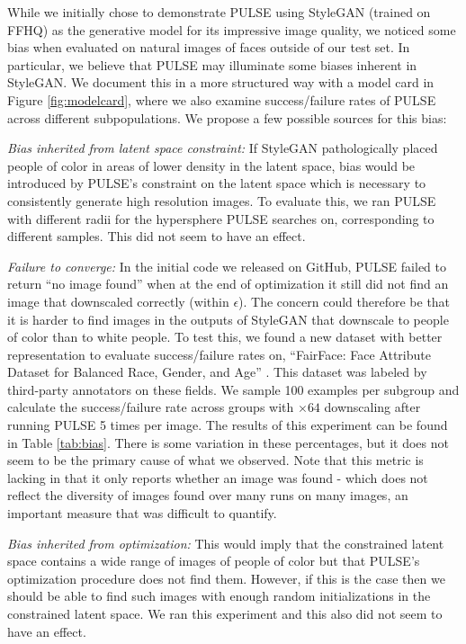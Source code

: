 \documentclass[10pt,twocolumn,letterpaper]{article}
\begin{document}
While we initially chose to demonstrate PULSE using StyleGAN (trained on FFHQ) as the generative model for its impressive image quality, we noticed some bias when evaluated on natural images of faces outside of our test set. In particular, we believe that PULSE may illuminate some biases inherent in StyleGAN. We document this in a more structured way with a model card in Figure \ref{fig:modelcard}, where we also examine success/failure rates of PULSE across different subpopulations. We propose a few possible sources for this bias:
\newline

\noindent\textit{Bias inherited from latent space constraint:} If StyleGAN pathologically placed people of color in areas of lower density in the latent space, bias would be introduced by PULSE's constraint on the latent space which is necessary to consistently generate high resolution images. To evaluate this, we ran PULSE with different radii for the hypersphere PULSE searches on, corresponding to different samples. This did not seem to have an effect. 
\newline

\noindent\textit{Failure to converge:} In the initial code we released on GitHub, PULSE failed to return ``no image found'' when at the end of optimization it still did not find an image that downscaled correctly (within $\epsilon$). The concern could therefore be that it is harder to find images in the outputs of StyleGAN that downscale to people of color than to white people. To test this, we found a new dataset with better representation to evaluate success/failure rates on, ``FairFace: Face Attribute Dataset for Balanced Race, Gender, and Age'' \cite{fairface}. This dataset was labeled by third-party annotators on these fields. We sample 100 examples per subgroup and calculate the success/failure rate across groups with $\times64$ downscaling after running PULSE 5 times per image. The results of this experiment can be found in Table \ref{tab:bias}. There is some variation in these percentages, but it does not seem to be the primary cause of what we observed. Note that this metric is lacking in that it only reports whether an image was found - which does not reflect the diversity of images found over many runs on many images, an important measure that was difficult to quantify.
\newline

\noindent\textit{Bias inherited from optimization:} This would imply that the constrained latent space contains a wide range of images of people of color but that PULSE's optimization procedure does not find them. However, if this is the case then we should be able to find such images with enough random initializations in the constrained latent space. We ran this experiment and this also did not seem to have an effect. \newline
\end{document}
